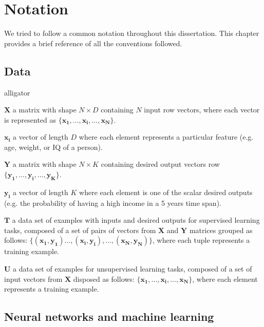 \chapter*{Notation} \label{ch:notation}
We tried to follow a common notation throughout this dissertation. This chapter provides a brief reference of all the conventions followed. 


\section*{Data}

\begin{labeling}{alligator}
	\item [$\mathbf{X}$] a matrix with shape $N \times D$ containing $N$ input row vectors, where each vector is represented as $\{\mathbf{x_1},...,\mathbf{x_i},...,\mathbf{x_N}\}$.
	\item [$\mathbf{x_i}$] a vector of length $D$ where each element represents a particular feature (e.g. age, weight, or IQ of a person).
	\item [$\mathbf{Y}$] a matrix with shape $N \times K$ containing desired output vectors row $\{\mathbf{y_1},...,\mathbf{y_i},...,\mathbf{y_K}\}$.
	\item [$\mathbf{y_i}$]  a vector of length $K$ where each element is one of the scalar desired outputs (e.g. the probability of having a high income in a 5 years time span).
	\item [$\mathbf{T}$] a data set  of examples with inputs and desired outputs for supervised learning tasks, composed of a set of pairs of vectors from $\mathbf{X}$ and $\mathbf{Y}$ matrices grouped as follows: $\{(\mathbf{x_1}, \mathbf{y_1})...,(\mathbf{x_i}, \mathbf{y_i}),...,(\mathbf{x_N}, \mathbf{y_N})\}$, where each tuple represents a training example.
	\item [$\mathbf{U}$] a data set of examples for unsupervised learning tasks, composed of a set of input vectors from $\mathbf{X}$ disposed as follows: $\{\mathbf{x_1},...,\mathbf{x_i},...,\mathbf{x_N}\}$, where each element represents a training example.
\end{labeling}

\section*{Neural networks and machine learning}

